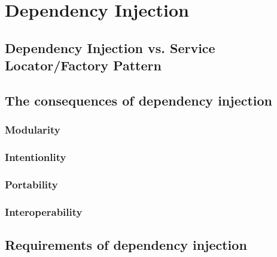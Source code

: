 \chapter{Dependency Injection}

\section{Dependency Injection vs. Service Locator/Factory Pattern}

\section{The consequences of dependency injection}

\subsection{Modularity}
\subsection{Intentionlity}
\subsection{Portability}
\subsection{Interoperability}

\section{Requirements of dependency injection}